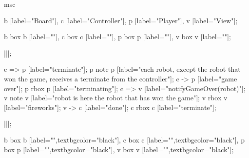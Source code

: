 \begin{msc}
msc
{

b [label="Board"],
c [label="Controller"],
p [label="Player"],
v [label="View"];

b box b [label=""],
c box c [label=""],
p box p [label=""],
v box v [label=""];

|||;

c => p [label="terminate"];
p note p [label="each robot, except the robot that won the game, receives a terminate from the controller"];
c -> p [label="game over"];
p rbox p [label="terminating"];
c => v [label="notifyGameOver(robot)"];
v note v [label="robot is here the robot that has won the game"];
v rbox v [label="fireworks"];
v -> c [label="done"];
c rbox c [label="terminate"];

|||;

b box b [label="",textbgcolor="black"],
c box c [label="",textbgcolor="black"],
p box p [label="",textbgcolor="black"],
v box v [label="",textbgcolor="black"];

}
\end{msc}
